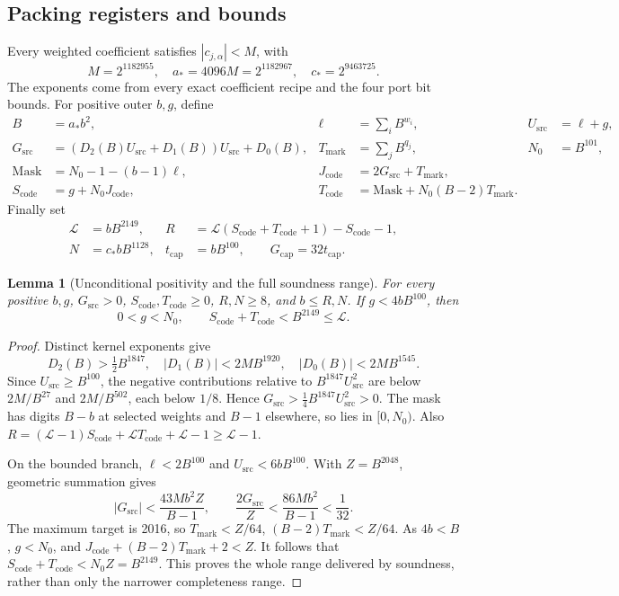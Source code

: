 \documentclass[11pt,a4paper]{article}
\newtheorem{lemma}[theorem]{Lemma}
\theoremstyle{remark}
\newcommand{\Sc}{S_{\mathrm{code}}}
\newcommand{\Tc}{T_{\mathrm{code}}}
\newcommand{\Gs}{G_{\mathrm{src}}}
\newcommand{\Us}{U_{\mathrm{src}}}
\newcommand{\Targets}{T_{\mathrm{mark}}}
\newcommand{\Gcap}{G_{\mathrm{cap}}}
\begin{document}
\subsection{Packing registers and bounds}

Every weighted coefficient satisfies \(|c_{j,\alpha}|<M\), with
\[
 M=2^{1182955},\quad a_\ast=4096M=2^{1182967},\quad
 c_\ast=2^{9463725}.
\]
The exponents come from every exact coefficient recipe and the four
port bit bounds. For positive outer \(b,g\), define
\begin{align}
 B&=a_\ast b^2,& \ell&=\sum_iB^{w_i},&\Us&=\ell+g,\nonumber\\
 \Gs&=(D_2(B)\Us+D_1(B))\Us+D_0(B),&
 \Targets&=\sum_jB^{q_j},&N_0&=B^{101},\nonumber\\
 \mathrm{Mask}&=N_0-1-(b-1)\ell,&
 J_{\mathrm{code}}&=2\Gs+\Targets,\nonumber\\
 \Sc&=g+N_0J_{\mathrm{code}},&
 \Tc&=\mathrm{Mask}+N_0(B-2)\Targets .\label{eq:pack-registers}
\end{align}
Finally set
\begin{equation}
\begin{aligned}
 \mathcal L&=bB^{2149},&
 R&=\mathcal L(\Sc+\Tc+1)-\Sc-1,\\
 N&=c_\ast bB^{1128},&
 t_{\mathrm{cap}}&=bB^{100},\qquad
 \Gcap=32t_{\mathrm{cap}} .
\end{aligned}
\label{eq:calibration}
\end{equation}

\begin{lemma}[Unconditional positivity and the full soundness range]
\label{lem:bounds}
For every positive \(b,g\), \(\Gs>0\), \(\Sc,\Tc\ge0\),
\(R,N\ge8\), and \(b\le R,N\). If \(g<4bB^{100}\), then
\[
 0<g<N_0,\qquad \Sc+\Tc<B^{2149}\le\mathcal L.
\]
\end{lemma}
\begin{proof}
Distinct kernel exponents give
\[
 D_2(B)>\tfrac12B^{1847},\quad
 |D_1(B)|<2MB^{1920},\quad |D_0(B)|<2MB^{1545}.
\]
Since \(\Us\ge B^{100}\), the negative contributions relative to
\(B^{1847}\Us^2\) are below \(2M/B^{27}\) and \(2M/B^{502}\),
each below \(1/8\). Hence \(\Gs>\tfrac14B^{1847}\Us^2>0\).
The mask has digits \(B-b\) at selected weights and \(B-1\)
elsewhere, so lies in \([0,N_0)\).
Also \(R=(\mathcal L-1)\Sc+\mathcal L\Tc+\mathcal L-1\ge\mathcal L-1\).

On the bounded branch, \(\ell<2B^{100}\) and \(\Us<6bB^{100}\).
With \(Z=B^{2048}\), geometric summation gives
\[
 |\Gs|<\frac{43Mb^2Z}{B-1},\qquad
 \frac{2\Gs}{Z}<\frac{86Mb^2}{B-1}<\frac1{32}.
\]
The maximum target is 2016, so
\(\Targets<Z/64\), \((B-2)\Targets<Z/64\).
As \(4b<B\), \(g<N_0\), and
\(J_{\mathrm{code}}+(B-2)\Targets+2<Z\).
It follows that \(\Sc+\Tc<N_0Z=B^{2149}\).
This proves the whole range delivered by soundness, rather than
only the narrower completeness range.
\end{proof}
\end{document}
